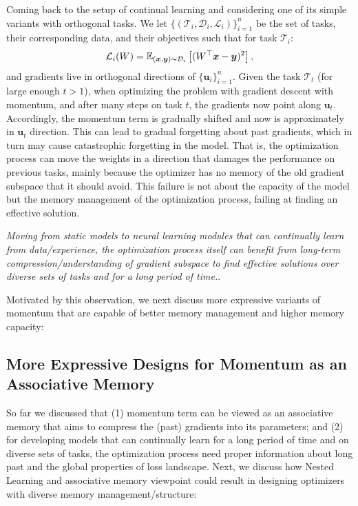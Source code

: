 \documentclass{article}
\newcommand{\vu}{\boldsymbol{u}}
\newcommand{\vx}{\boldsymbol{x}}
\newcommand{\vy}{\boldsymbol{y}}
\begin{document}
Coming back to the setup of continual learning and considering one of its simple variants with orthogonal tasks. We let $\{(\mathcal{T}_i, \mathcal{D}_i, \mathcal{L}_{i})\}_{i = 1}^{n}$ be the set of tasks, their corresponding data, and their objectives such that for task $\mathcal{T}_i$:
\begin{align}
    \mathcal{L}_i(W) = \mathbb{E}_{(\vx, \vy)\thicksim \mathcal{D}_{i}}\left[ (W^{\top} \vx - \vy)^2 \right],
\end{align}
and gradients live in orthogonal directions of $\{\vu_i\}_{i = 1}^{n}$. Given the task $\mathcal{T}_t$ (for large enough $t > 1$), when optimizing the problem with gradient descent with momentum, and after many steps on task $t$, the gradients now point along $\vu_t$. Accordingly, the momentum term is gradually shifted and now is approximately in $\vu_t$ direction. This can lead to gradual forgetting about past gradients, which in turn may cause catastrophic forgetting in the model. That is, the optimization process can move the weights in a direction that damages the performance on previous tasks, mainly because the optimizer has no memory of the old gradient subspace that it should avoid. This failure is not about the capacity of the model but the memory management of the optimization process, failing at finding an effective solution. 

\begin{myboxi}
    \textit{Moving from static models to neural learning modules that can continually learn from data/experience, the optimization process itself can benefit from long-term compression/understanding of gradient subspace to find effective solutions over diverse sets of tasks and for a long period of time.}.
\end{myboxi}

Motivated by  this observation, we next discuss more expressive variants of momentum that are capable of better memory management and higher memory capacity:

\subsection{More Expressive Designs for Momentum as an Associative Memory}\label{sec:more-expressive-momentum}
So far we discussed that (1) momentum term can be viewed as an associative memory that aims to compress the (past) gradients into its parameters; and (2) for developing models that can continually learn for a long period of time and on diverse sets of tasks, the optimization process need proper information about long past and the global properties of loss landscape. Next, we discuss how  Nested Learning and associative memory viewpoint could result in designing optimizers with diverse memory management/structure:
\end{document}
